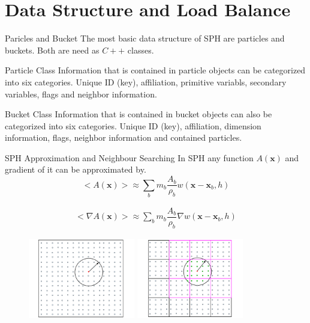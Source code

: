 \documentclass{beamer}
\begin{document}
\section{Data Structure and Load Balance}
\begin{frame}{Paricles and Bucket}
The most basic data structure of SPH are particles and buckets. Both are need as $C++$ classes.
\begin{block}{Particle Class}
Information that is contained in particle objects can be categorized into six categories.
Unique ID (key), affiliation, primitive variabls, secondary variables, flags and neighbor information.
\end{block}
\begin{block}{Bucket Class}
Information that is contained in bucket objects can also be categorized into six categories.
Unique ID (key), affiliation, dimension information, flags, neighbor information and contained particles.
\end{block}
\end{frame}

\begin{frame}{SPH Approximation and Neighbour Searching}
In SPH any function $A(\textbf{x})$ and gradient of it can be approximated by.
\begin{equation}
<A\left(\textbf{x}\right)> \approx \sum_b m_b \dfrac{A_b}{\rho_b} w\left(\textbf{x}-\textbf{x}_b, h\right)
\label{eq:SPH-approximation-sum}
\end{equation}

\begin{equation}
\begin{split}
<\nabla A\left(\textbf{x}\right)> \approx \sum_b m_b \dfrac{A_b}{\rho_b} \nabla w\left(\textbf{x} - \textbf{x}_b, h\right)
\end{split} 
\label{eq:SPH-scalar-function-gradient}
\end{equation}

\begin{figure}
\flushleft
\includegraphics[width=0.415\textwidth]{Neighor-searching-noBG}
\hfill
\includegraphics[width=0.415\textwidth]{Neighbor-Search}
\end{figure}
\end{frame}
\end{document}
